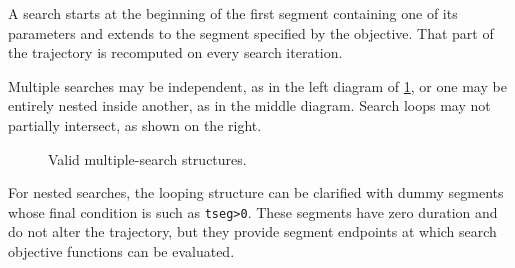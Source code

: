 
A search starts at the beginning of the first segment containing one of its parameters
and extends to the segment specified by the objective. That part of the trajectory is
recomputed on every search iteration.

Multiple searches may be independent, as in the left diagram of
\cref{fig:multiple-search-structures}, or one may be entirely nested inside another,
as in the middle diagram. Search loops may not partially intersect, as shown on the
right.

\begin{figure}[htbp]
  \centering
  
  \caption{Valid multiple-search structures.}
  \label{fig:multiple-search-structures}
\end{figure}

For nested searches, the looping structure can be clarified with dummy segments
whose final condition is such as \texttt{tseg>0}. These segments have zero duration
and do not alter the trajectory, but they provide segment endpoints at which search
objective functions can be evaluated.
